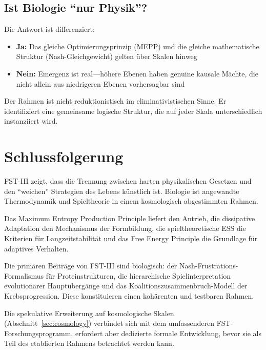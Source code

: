 \documentclass[12pt,a4paper]{article}
\theoremstyle{remark}
\begin{document}
\subsection{Ist Biologie ``nur Physik''?}

Die Antwort ist differenziert:
\begin{itemize}
    \item \textbf{Ja:} Das gleiche Optimierungsprinzip (MEPP) und die gleiche mathematische Struktur (Nash-Gleichgewicht) gelten \"uber Skalen hinweg
    \item \textbf{Nein:} Emergenz ist real---h\"ohere Ebenen haben genuine kausale M\"achte, die nicht allein aus niedrigeren Ebenen vorhersagbar sind
\end{itemize}

Der Rahmen ist nicht reduktionistisch im eliminativistischen Sinne. Er identifiziert eine gemeinsame logische Struktur, die auf jeder Skala unterschiedlich instanziiert wird.

\section{Schlussfolgerung}
\label{sec:conclusion}

FST-III zeigt, dass die Trennung zwischen harten physikalischen Gesetzen und den ``weichen'' Strategien des Lebens k\"unstlich ist. Biologie ist angewandte Thermodynamik und Spieltheorie in einem kosmologisch abgestimmten Rahmen.

Das Maximum Entropy Production Principle liefert den Antrieb, die dissipative Adaptation den Mechanismus der Formbildung, die spieltheoretische ESS die Kriterien f\"ur Langzeitstabilit\"at und das Free Energy Principle die Grundlage f\"ur adaptives Verhalten.

Die prim\"aren Beitr\"age von FST-III sind biologisch: der Nash-Frustrations-Formalismus f\"ur Proteinstrukturen, die hierarchische Spielinterpretation evolution\"arer Haupt\"uberg\"ange und das Koalitionszusammenbruch-Modell der Krebsprogression. Diese konstituieren einen koh\"arenten und testbaren Rahmen.

Die spekulative Erweiterung auf kosmologische Skalen (Abschnitt~\ref{sec:cosmology}) verbindet sich mit dem umfassenderen FST-Forschungsprogramm, erfordert aber dedizierte formale Entwicklung, bevor sie als Teil des etablierten Rahmens betrachtet werden kann.
\end{document}
